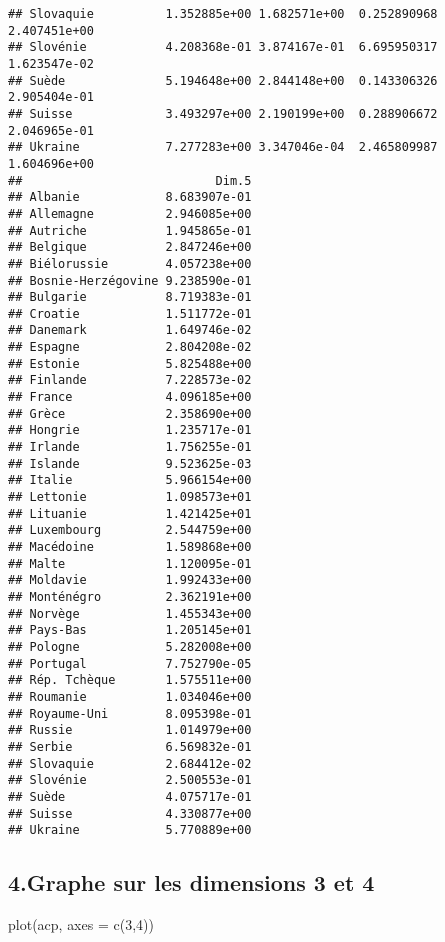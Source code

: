 \documentclass[
]{article}
\newenvironment{Shaded}{\begin{snugshade}}{\end{snugshade}}
\newcommand{\AttributeTok}[1]{\textcolor[rgb]{0.77,0.63,0.00}{#1}}
\newcommand{\DecValTok}[1]{\textcolor[rgb]{0.00,0.00,0.81}{#1}}
\newcommand{\FunctionTok}[1]{\textcolor[rgb]{0.00,0.00,0.00}{#1}}
\newcommand{\NormalTok}[1]{#1}
\begin{document}
\begin{verbatim}
## Slovaquie          1.352885e+00 1.682571e+00  0.252890968 2.407451e+00
## Slovénie           4.208368e-01 3.874167e-01  6.695950317 1.623547e-02
## Suède              5.194648e+00 2.844148e+00  0.143306326 2.905404e-01
## Suisse             3.493297e+00 2.190199e+00  0.288906672 2.046965e-01
## Ukraine            7.277283e+00 3.347046e-04  2.465809987 1.604696e+00
##                           Dim.5
## Albanie            8.683907e-01
## Allemagne          2.946085e+00
## Autriche           1.945865e-01
## Belgique           2.847246e+00
## Biélorussie        4.057238e+00
## Bosnie-Herzégovine 9.238590e-01
## Bulgarie           8.719383e-01
## Croatie            1.511772e-01
## Danemark           1.649746e-02
## Espagne            2.804208e-02
## Estonie            5.825488e+00
## Finlande           7.228573e-02
## France             4.096185e+00
## Grèce              2.358690e+00
## Hongrie            1.235717e-01
## Irlande            1.756255e-01
## Islande            9.523625e-03
## Italie             5.966154e+00
## Lettonie           1.098573e+01
## Lituanie           1.421425e+01
## Luxembourg         2.544759e+00
## Macédoine          1.589868e+00
## Malte              1.120095e-01
## Moldavie           1.992433e+00
## Monténégro         2.362191e+00
## Norvège            1.455343e+00
## Pays-Bas           1.205145e+01
## Pologne            5.282008e+00
## Portugal           7.752790e-05
## Rép. Tchèque       1.575511e+00
## Roumanie           1.034046e+00
## Royaume-Uni        8.095398e-01
## Russie             1.014979e+00
## Serbie             6.569832e-01
## Slovaquie          2.684412e-02
## Slovénie           2.500553e-01
## Suède              4.075717e-01
## Suisse             4.330877e+00
## Ukraine            5.770889e+00
\end{verbatim}

\hypertarget{graphe-sur-les-dimensions-3-et-4}{%
\subsection{4.Graphe sur les dimensions 3 et
4}\label{graphe-sur-les-dimensions-3-et-4}}

\begin{Shaded}
\begin{Highlighting}[]
\FunctionTok{plot}\NormalTok{(acp, }\AttributeTok{axes =} \FunctionTok{c}\NormalTok{(}\DecValTok{3}\NormalTok{,}\DecValTok{4}\NormalTok{))}
\end{Highlighting}
\end{Shaded}
\end{document}

